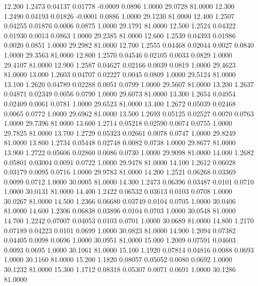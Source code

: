   12.200   1.2473   0.04137   0.01778  -0.0009   0.0896   1.0000  29.0728  81.0000
  12.300   1.2490   0.04193   0.01826  -0.0001   0.0886   1.0000  29.1230  81.0000
  12.400   1.2507   0.04255   0.01876   0.0006   0.0875   1.0000  29.1791  81.0000
  12.500   1.2524   0.04322   0.01930   0.0013   0.0863   1.0000  29.2385  81.0000
  12.600   1.2539   0.04393   0.01986   0.0020   0.0851   1.0000  29.2982  81.0000
  12.700   1.2555   0.04468   0.02044   0.0027   0.0840   1.0000  29.3563  81.0000
  12.800   1.2570   0.04546   0.02105   0.0033   0.0829   1.0000  29.4107  81.0000
  12.900   1.2587   0.04627   0.02166   0.0039   0.0819   1.0000  29.4623  81.0000
  13.000   1.2603   0.04707   0.02227   0.0045   0.0809   1.0000  29.5124  81.0000
  13.100   1.2620   0.04789   0.02288   0.0051   0.0799   1.0000  29.5607  81.0000
  13.200   1.2637   0.04871   0.02349   0.0056   0.0790   1.0000  29.6073  81.0000
  13.300   1.2654   0.04954   0.02409   0.0061   0.0781   1.0000  29.6523  81.0000
  13.400   1.2672   0.05039   0.02468   0.0065   0.0772   1.0000  29.6962  81.0000
  13.500   1.2693   0.05125   0.02527   0.0070   0.0763   1.0000  29.7396  81.0000
  13.600   1.2714   0.05218   0.02590   0.0074   0.0755   1.0000  29.7825  81.0000
  13.700   1.2729   0.05323   0.02661   0.0078   0.0747   1.0000  29.8249  81.0000
  13.800   1.2734   0.05448   0.02748   0.0082   0.0738   1.0000  29.8677  81.0000
  13.900   1.2722   0.05606   0.02860   0.0086   0.0730   1.0000  29.9098  81.0000
  14.000   1.2682   0.05801   0.03004   0.0091   0.0722   1.0000  29.9478  81.0000
  14.100   1.2612   0.06028   0.03179   0.0095   0.0716   1.0000  29.9783  81.0000
  14.200   1.2521   0.06268   0.03369   0.0099   0.0712   1.0000  30.0005  81.0000
  14.300   1.2473   0.06396   0.03487   0.0101   0.0710   1.0000  30.0131  81.0000
  14.400   1.2422   0.06532   0.03613   0.0103   0.0708   1.0000  30.0267  81.0000
  14.500   1.2366   0.06680   0.03749   0.0104   0.0705   1.0000  30.0406  81.0000
  14.600   1.2306   0.06838   0.03896   0.0104   0.0703   1.0000  30.0548  81.0000
  14.700   1.2242   0.07007   0.04053   0.0103   0.0701   1.0000  30.0689  81.0000
  14.800   1.2170   0.07189   0.04223   0.0101   0.0699   1.0000  30.0823  81.0000
  14.900   1.2094   0.07382   0.04405   0.0098   0.0696   1.0000  30.0951  81.0000
  15.000   1.2009   0.07591   0.04603   0.0093   0.0695   1.0000  30.1061  81.0000
  15.100   1.1920   0.07814   0.04816   0.0088   0.0693   1.0000  30.1160  81.0000
  15.200   1.1820   0.08057   0.05052   0.0080   0.0692   1.0000  30.1232  81.0000
  15.300   1.1712   0.08318   0.05307   0.0071   0.0691   1.0000  30.1286  81.0000
